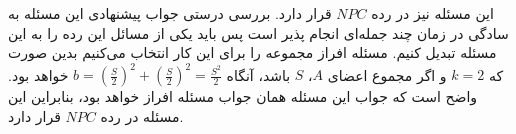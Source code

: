 \documentclass[]{article}
\begin{document}
این مسئله نیز در رده $NPC$ قرار دارد.
بررسی درستی جواب پیشنهادی این مسئله به سادگی در زمان چند جمله‌ای
انجام پذیر است پس باید یکی از مسائل این رده را به این مسئله تبدیل کنیم.
مسئله افراز مجموعه را برای این کار انتخاب می‌کنیم بدین صورت که 
$k = 2$ و
اگر مجموع اعضای $A$، $S$ باشد،
آنگاه $\displaystyle b = (\frac{S}{2})^2 + (\frac{S}{2})^2 = \frac{S^2}{2}$ خواهد بود.
واضح است که جواب این مسئله همان جواب مسئله افراز خواهد بود، بنابراین این مسئله
در رده $NPC$ قرار دارد.
\end{document}
